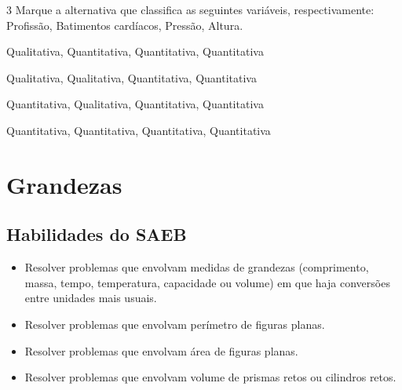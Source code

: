 \num{3} Marque a alternativa que classifica as seguintes variáveis,
respectivamente: Profissão, Batimentos cardíacos, Pressão, Altura.

\begin{escolha}[itemsep=0pt]
\item Qualitativa, Quantitativa, Quantitativa, Quantitativa
\item Qualitativa, Qualitativa, Quantitativa, Quantitativa
\item Quantitativa, Qualitativa, Quantitativa, Quantitativa
\item Quantitativa, Quantitativa, Quantitativa, Quantitativa
\end{escolha}



\chapter{Grandezas}

\section*{Habilidades do SAEB}
\begin{itemize}
\item
  Resolver problemas que envolvam medidas de grandezas (comprimento,
  massa, tempo, temperatura, capacidade ou volume) em que haja
  conversões entre unidades mais usuais.
\item
  Resolver problemas que envolvam perímetro de figuras planas.
\item
  Resolver problemas que envolvam área de figuras planas.
\item
  Resolver problemas que envolvam volume de prismas retos ou cilindros
  retos.
\end{itemize}

